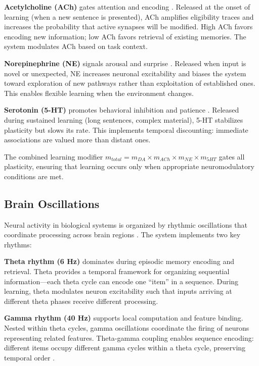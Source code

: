 \documentclass[11pt]{article}
\begin{document}
\textbf{Acetylcholine (ACh)} gates attention and encoding \citep{hasselmo2006mechanisms}. Released at the onset of learning (when a new sentence is presented), ACh amplifies eligibility traces and increases the probability that active synapses will be modified. High ACh favors encoding new information; low ACh favors retrieval of existing memories. The system modulates ACh based on task context.

\textbf{Norepinephrine (NE)} signals arousal and surprise \citep{sara2009locus}. Released when input is novel or unexpected, NE increases neuronal excitability and biases the system toward exploration of new pathways rather than exploitation of established ones. This enables flexible learning when the environment changes.

\textbf{Serotonin (5-HT)} promotes behavioral inhibition and patience \citep{miyazaki2014optogenetic}. Released during sustained learning (long sentences, complex material), 5-HT stabilizes plasticity but slows its rate. This implements temporal discounting: immediate associations are valued more than distant ones.

The combined learning modifier $m_{total} = m_{DA} \times m_{ACh} \times m_{NE} \times m_{5HT}$ gates all plasticity, ensuring that learning occurs only when appropriate neuromodulatory conditions are met.

\subsection{Brain Oscillations}

Neural activity in biological systems is organized by rhythmic oscillations that coordinate processing across brain regions \citep{buzsaki2006rhythms}. The system implements two key rhythms:

\textbf{Theta rhythm (6 Hz)} dominates during episodic memory encoding and retrieval. Theta provides a temporal framework for organizing sequential information---each theta cycle can encode one ``item'' in a sequence. During learning, theta modulates neuron excitability such that inputs arriving at different theta phases receive different processing.

\textbf{Gamma rhythm (40 Hz)} supports local computation and feature binding. Nested within theta cycles, gamma oscillations coordinate the firing of neurons representing related features. Theta-gamma coupling enables sequence encoding: different items occupy different gamma cycles within a theta cycle, preserving temporal order \citep{lisman2005theta}.
\end{document}
